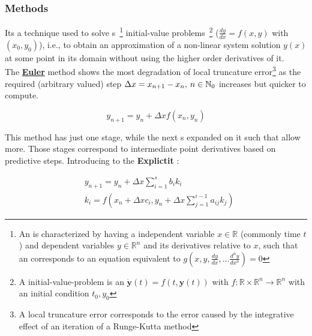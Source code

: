 \subsubsection{ Methods}
\label{subsub:Runge-Kutta_Methods}

Its a technique used to solve s~\footnote{An  is characterized by having a independent variable \(x \in \mathbb{R}\) (commonly time \(t\)) and dependent variables \(y \in \mathbb{R}^n\) and its derivatives relative to \(x\), such that an  corresponds to an equation equivalent to \(g(x,y, \frac{dy}{dx}, ... \frac{d^{n}y}{dx^n})= 0\)  } initial-value problems~\footnote{A initial-value-problem is an  \(\dot{\mathbf{y}}(t) = f(t, \mathbf{y}(t))\) with \( f: \mathbb{R} \times \mathbb{R}^n \to \mathbb{R}^n\) with an initial condition \(t_0,y_0\)} (\(\frac{dy}{dx} = f(x,y)\) with \((x_0, y_0)\)), i.e., to obtain an approximation of a non-linear system solution \(y(x)\) at some point in its domain without using the higher order derivatives of it. \\

The \underline{\textbf{Euler}} method shows the most degradation of local truncature error\footnote{A local truncature error corresponds to the error caused by the integrative effect of an iteration of a Runge-Kutta method} as the required (arbitrary valued) step \(\Delta x = x_{n+1} - x_n, \hspace{0.2em} n \in \mathbb{N}_0\) increases but quicker to compute.

\begin{equation}
    y_{n+1} = y_{n} + \Delta x f(x_{n}, y_{n})
    \label{eq:Euler_Method}
\end{equation}

This method has just one stage, while the next s expanded on it such that allow more. Those stages correspond to intermediate point derivatives based on predictive steps. Introducing to the \textbf{Explictit } \label{subsubsub:RK_Explicit}:


\begin{subequations}
    \begin{align}
        &y_{n+1} = y_n + \Delta x \sum^s_{i=1}b_i k_i \label{eq:Update_RKbased} \\
        &k_i = f(x_n + \Delta x c_i, y_n + \Delta x \sum^{i-1}_{j=1} a_{ij}k_j) \label{eq:Derivatives_Explicit-RK}  
    \end{align}
    \label{eq:Explicit-RK}  
\end{subequations}

